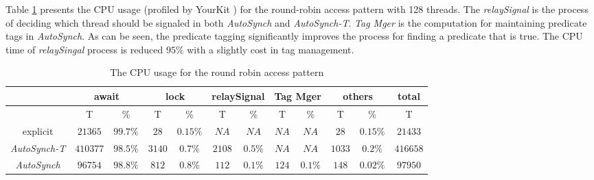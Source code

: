 \documentclass{sigplanconf}
\begin{document}
Table \ref{tab:cpu} presents the CPU usage (profiled by YourKit \cite{yourkit}) 
for the round-robin access pattern with 128 threads. The {\em relaySignal} is the
process of deciding which thread should be signaled in both {\em AutoSynch} and
{\em AutoSynch-T}. {\em Tag Mger} is the computation for
maintaining predicate tags in {\em AutoSynch}. 
As can be seen, the 
predicate tagging significantly improves the process for finding a predicate 
that is true. The CPU time of {\em relaySingal} process is reduced $95\%$ with
a slightly cost in tag management. 

\begin{table}[ht!]
   \centering
   \begin{tabular}{|c||c|c||c|c||c|c||c|c|c|c|c|}
      \hline 
      & \multicolumn{2}{c||}{await} & \multicolumn{2}{c||}{lock} & 
        \multicolumn{2}{c||}{relaySignal} & \multicolumn{2}{c|}{Tag Mger} &
        \multicolumn{2}{c|}{others} & total \\
      \hline
         & T & \% & T & \% & T & \% & T & \% & T & \% & T \\
      \hline 
      \hline 
      explicit & $21365$ & $99.7\%$ & $28$ & $0.15\%$ & $NA$ & $NA$ & $NA$ &
      $NA$  & $28$ & $0.15\%$ & $21433$ \\
      \hline 
      {\em AutoSynch-T} & $410377$ & $98.5\%$ & $3140$ & $0.7\%$ & $2108$ & $0.5\%$
      & $NA$ & $NA$ & $1033$ & $0.2\%$ & $416658$\\
      \hline 
      {\em AutoSynch} & $96754$ & $98.8\%$ & $812$ & $0.8\%$ & $112$ & $0.1\%$ & 
      $124$ & $0.1\%$ & $148$ & $0.02\%$ & $97950$\\
      \hline 
   \end{tabular}
   \caption{The CPU usage for the round robin access pattern}
   \label{tab:cpu}
\end{table}
\end{document}
